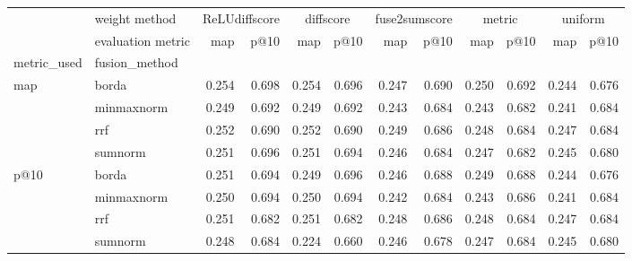\begin{tabular}{llrrrrrrrrrr}
\toprule
 & weight method & \multicolumn{2}{c}{ReLUdiffscore} & \multicolumn{2}{c}{diffscore} & \multicolumn{2}{c}{fuse2sumscore} & \multicolumn{2}{c}{metric} & \multicolumn{2}{c}{uniform} \\
 & evaluation metric & map & p@10 & map & p@10 & map & p@10 & map & p@10 & map & p@10 \\
metric_used & fusion_method &  &  &  &  &  &  &  &  &  &  \\
\midrule
\multirow[t]{4}{*}{map} & borda & 0.254 & 0.698 & 0.254 & 0.696 & 0.247 & 0.690 & 0.250 & 0.692 & 0.244 & 0.676 \\
 & minmaxnorm & 0.249 & 0.692 & 0.249 & 0.692 & 0.243 & 0.684 & 0.243 & 0.682 & 0.241 & 0.684 \\
 & rrf & 0.252 & 0.690 & 0.252 & 0.690 & 0.249 & 0.686 & 0.248 & 0.684 & 0.247 & 0.684 \\
 & sumnorm & 0.251 & 0.696 & 0.251 & 0.694 & 0.246 & 0.684 & 0.247 & 0.682 & 0.245 & 0.680 \\
\cline{1-12}
\multirow[t]{4}{*}{p@10} & borda & 0.251 & 0.694 & 0.249 & 0.696 & 0.246 & 0.688 & 0.249 & 0.688 & 0.244 & 0.676 \\
 & minmaxnorm & 0.250 & 0.694 & 0.250 & 0.694 & 0.242 & 0.684 & 0.243 & 0.686 & 0.241 & 0.684 \\
 & rrf & 0.251 & 0.682 & 0.251 & 0.682 & 0.248 & 0.686 & 0.248 & 0.684 & 0.247 & 0.684 \\
 & sumnorm & 0.248 & 0.684 & 0.224 & 0.660 & 0.246 & 0.678 & 0.247 & 0.684 & 0.245 & 0.680 \\
\cline{1-12}
\bottomrule
\end{tabular}
